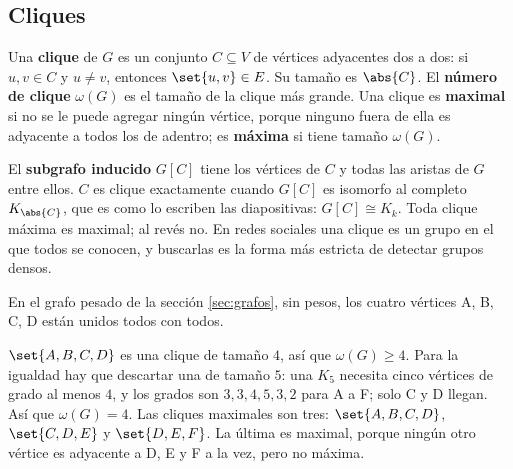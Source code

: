 \documentclass[11pt,letterpaper]{article}
\begin{document}

\subsection*{Cliques}

\begin{definicion}[Clique]
  \label{def:clique}
  Una \textbf{clique} de $G$ es un conjunto $C \subseteq V$ de
  vértices adyacentes dos a dos: si $u, v \in C$ y $u \ne v$,
  entonces $\set{u, v} \in E$. Su tamaño es $\abs{C}$. El
  \textbf{número de clique} $\omega(G)$ es el tamaño de la clique más
  grande. Una clique es \textbf{maximal} si no se le puede agregar
  ningún vértice, porque ninguno fuera de ella es adyacente a todos
  los de adentro; es \textbf{máxima} si tiene tamaño $\omega(G)$.
\end{definicion}

El \textbf{subgrafo inducido} $G[C]$ tiene los vértices de $C$ y todas
las aristas de $G$ entre ellos. $C$ es clique exactamente cuando
$G[C]$ es isomorfo al completo $K_{\abs{C}}$, que es como lo escriben
las diapositivas: $G[C] \cong K_k$. Toda clique máxima es maximal; al
revés no. En redes sociales una clique es un grupo en el que todos se
conocen, y buscarlas es la forma más estricta de detectar grupos
densos.

\begin{ejemplo}
  \label{ej:clique-pesado}
  En el grafo pesado de la sección \ref{sec:grafos}, sin pesos, los
  cuatro vértices A, B, C, D están unidos todos con todos.
  \begin{center}
  \end{center}
  $\set{A, B, C, D}$ es una clique de tamaño $4$, así que
  $\omega(G) \ge 4$. Para la igualdad hay que descartar una de tamaño
  $5$: una $K_5$ necesita cinco vértices de grado al menos $4$, y los
  grados son $3, 3, 4, 5, 3, 2$ para A a F; solo C y D llegan. Así
  que $\omega(G) = 4$. Las cliques maximales son tres:
  $\set{A, B, C, D}$, $\set{C, D, E}$ y $\set{D, E, F}$. La última es
  maximal, porque ningún otro vértice es adyacente a D, E y F a la
  vez, pero no máxima.
\end{ejemplo}
\end{document}

